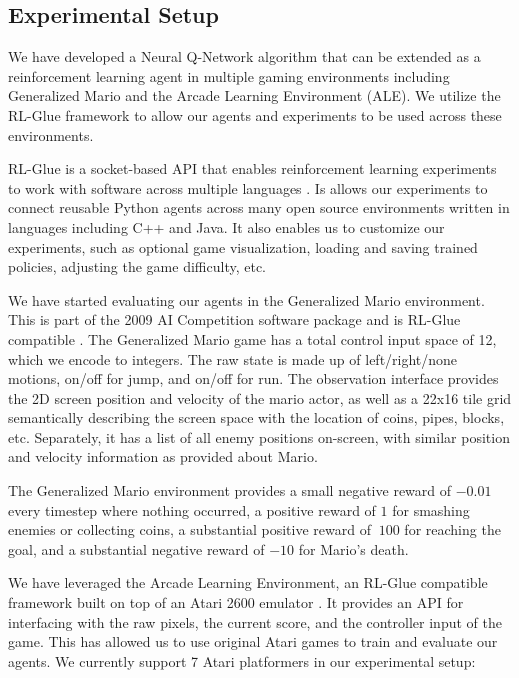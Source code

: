 \documentclass{article}
\begin{document}
\subsection{Experimental Setup}

We have developed a Neural Q-Network algorithm that can be extended as a reinforcement learning agent in multiple gaming environments including Generalized Mario and the Arcade Learning Environment (ALE). We utilize the RL-Glue framework to allow our agents and experiments to be used across these environments.

RL-Glue is a socket-based API that enables reinforcement learning experiments to work with software across multiple languages \cite{Tanner09}. Is allows our experiments to connect reusable Python agents across many open source environments written in languages including C++ and Java. It also enables us to customize our experiments, such as optional game visualization, loading and saving trained policies, adjusting the game difficulty, etc.

We have started evaluating our agents in the Generalized Mario environment. This is part of the 2009 AI Competition software package and is RL-Glue compatible \cite{Togelius10}. The Generalized Mario game has a total control input space of 12, which we encode to integers. The raw state is made up of left/right/none motions, on/off for jump, and on/off for run. The observation interface provides the 2D screen position and velocity of the mario actor, as well as a 22x16 tile grid semantically describing the screen space with the location of coins, pipes, blocks, etc. Separately, it has a list of all enemy positions on-screen, with similar position and velocity information as provided about Mario. 

The Generalized Mario environment provides a small negative reward of $-0.01$ every timestep where nothing occurred, a positive reward of $1$ for smashing enemies or collecting coins, a substantial positive reward of $~100$ for reaching the goal, and a substantial negative reward of $-10$ for Mario's death.

We have leveraged the Arcade Learning Environment, an RL-Glue compatible framework built on top of an Atari 2600 emulator \cite{bellemare13}.  It provides an API for interfacing with the raw pixels, the current score, and the controller input of the game. This has allowed us to use original Atari games to train and evaluate our agents. We currently support 7 Atari platformers in our experimental setup:
\end{document}
